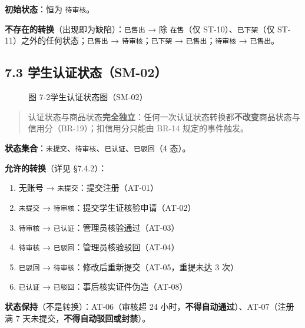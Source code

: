 \documentclass[12pt,a4paper]{ctexart}
\begin{document}
\textbf{初始状态}：恒为 \texttt{待审核}。


\textbf{不存在的转换}（出现即为缺陷）：\texttt{已售出} → 除 \texttt{在售}（仅 ST-10）、\texttt{已下架}（仅 ST-11）之外的任何状态；\texttt{已售出} → \texttt{待审核}；\texttt{已下架} → \texttt{已售出}；\texttt{待审核} → \texttt{已售出}。


\subsection*{7.3 学生认证状态（SM-02）}
\begin{figure}[htbp]
\centering
{}
\caption*{图 7-2\quad 学生认证状态图（SM-02）}
\label{fig:sm02}
\end{figure}

\begin{quote}\small
认证状态与商品状态\textbf{完全独立}：任何一次认证状态转换都\textbf{不改变}商品状态与信用分（BR-19）；扣信用分只能由 BR-14 规定的事件触发。

\end{quote}

\textbf{状态集合}：\texttt{未提交}、\texttt{待审核}、\texttt{已认证}、\texttt{已驳回}（4 态）。


\textbf{允许的转换}（详见 §7.4.2）：


\begin{enumerate}[leftmargin=1.9em,itemsep=1pt,topsep=2pt]
\item 无账号 → \texttt{未提交}：提交注册（AT-01）
\item \texttt{未提交} → \texttt{待审核}：提交学生证核验申请（AT-02）
\item \texttt{待审核} → \texttt{已认证}：管理员核验通过（AT-03）
\item \texttt{待审核} → \texttt{已驳回}：管理员核验驳回（AT-04）
\item \texttt{已驳回} → \texttt{待审核}：修改后重新提交（AT-05，重提未达 3 次）
\item \texttt{已认证} → \texttt{已驳回}：事后核实证件伪造（AT-08）
\end{enumerate}

\textbf{状态保持}（不是转换）：AT-06（审核超 24 小时，\textbf{不得自动通过}）、AT-07（注册满 7 天未提交，\textbf{不得自动驳回或封禁}）。
\end{document}
